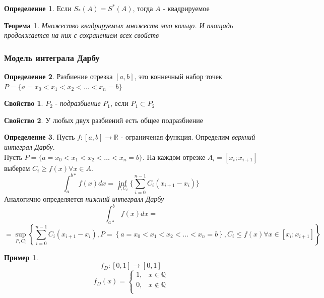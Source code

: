 \documentclass[a4paper]{article}
\newtheorem{theorem}{Теорема}
\theoremstyle{definition}
\newtheorem*{definition*}{Определение}
\newtheorem*{exmp}{Пример}
\newtheorem*{comment}{Замечание}
\newtheorem*{property*}{Свойство}
\newcommand\Set[1]{%
\left\{ #1 \right\}}
\numberwithin{theorem}{subsection}
\numberwithin{lemma}{subsection}
\numberwithin{definition}{subsection}
\numberwithin{comment*}{subsection}
\numberwithin{consequence}{subsection}
\numberwithin{property}{subsection}
\begin{document}
\begin{definition*}
 Если $S_*(A) = S^*(A)$, тогда $A$ - квадрируемое
\end{definition*}
\begin{theorem}
 Множество квадрируемых множеств это кольцо. И площадь продолжается на них с сохранением всех свойств
\end{theorem}
\subsubsection{Модель интеграла Дарбу}
\begin{definition*}
 Разбиение отрезка $[a,b]$, это коннечный набор точек $P = \{ a= x_0 <x_1 < x_2< \dots < x_n = b \}$
\end{definition*}
\begin{property*}
 $P_2$ - \textit{подразбиение} $P_1$, если $P_1 \subset P_2$
\end{property*}
\begin{property*}
 У любых двух разбиений есть общее подразбиение
\end{property*}
\begin{definition*}
 Пусть $f: [a,b] \rightarrow \mathbb{R}$ - ограниченая функция.
 Определим \textit{верхний интеграл Дарбу}.\\
 Пусть $P = \{ a= x_0 <x_1 < x_2< \dots < x_n = b \}$. На каждом отрезке $A_i = [x_i;x_{i+1}]$ выберем $C_i \geq f(x) \forall{x} \in A$.
 $$ \int_a^{b*} f(x)  dx = \inf_{P, C_i}\{\sum_{i=0}^{n-1}{C_i(x_{i+1}-x_i)}\} $$
 Аналогично определяется \textit{нижний интегралл Дарбу}
 $$ \int_{a*}^{b} f(x)  dx = $$
 $$=\sup_{P, C_i}\Set{\sum_{i=0}^{n-1}{C_i(x_{i+1}-x_i), P = \Set{ a= x_0 <x_1 < x_2< \dots < x_n = b }, C_i \leq f(x) \forall{x} \in [x_i;x_{i+1}]} } $$
\end{definition*}

\begin{exmp}
 $$f_D: [0,1] \rightarrow [0,1]$$
 $$ f_D(x) = \begin{cases}
   1, & x\in \mathbb{Q}     \\
   0, & x \notin \mathbb{Q} \\
  \end{cases}$$
\end{exmp}

\end{document}
